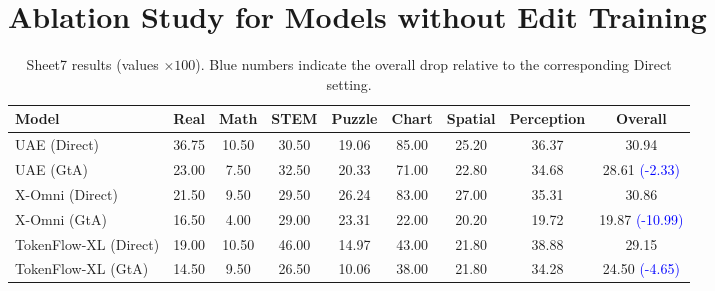 \documentclass{article}
\theoremstyle{plain}
\theoremstyle{definition}
\theoremstyle{remark}
\begin{document}
\section{Ablation Study for Models without Edit Training}
\label{sec:appendix_ood_ablation}

\begin{table}[ht]
\centering
\small
\setlength{\tabcolsep}{4pt}
\renewcommand{\arraystretch}{1.15}

\begin{tabularx}{\linewidth}{>{\raggedright\arraybackslash}X *{8}{c}}
\toprule
Model &
Real &
Math &
STEM &
Puzzle &
Chart &
Spatial &
Perception &
Overall \\
\midrule

UAE (Direct) 
& 36.75 & 10.50 & 30.50 & 19.06 & 85.00 & 25.20 & 36.37 & 30.94 \\

UAE (GtA) 
& 23.00 & 7.50 & 32.50 & 20.33 & 71.00 & 22.80 & 34.68 
& 28.61 {\textcolor{blue}{(-2.33)}} \\

\midrule

X-Omni (Direct) 
& 21.50 & 9.50 & 29.50 & 26.24 & 83.00 & 27.00 & 35.31 & 30.86 \\

X-Omni (GtA) 
& 16.50 & 4.00 & 29.00 & 23.31 & 22.00 & 20.20 & 19.72 
& 19.87 {\textcolor{blue}{(-10.99)}} \\

\midrule

TokenFlow-XL (Direct) 
& 19.00 & 10.50 & 46.00 & 14.97 & 43.00 & 21.80 & 38.88 & 29.15 \\

TokenFlow-XL (GtA) 
& 14.50 & 9.50 & 26.50 & 10.06 & 38.00 & 21.80 & 34.28 
& 24.50 {\textcolor{blue}{(-4.65)}} \\

\bottomrule
\end{tabularx}

\caption{Sheet7 results (values $\times 100$). Blue numbers indicate the overall drop relative to the corresponding Direct setting.}
\label{tab:sheet7_scaled}
\end{table}
\end{document}
